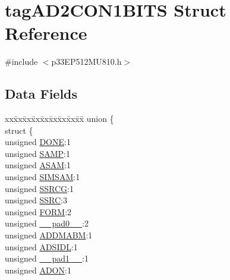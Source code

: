 \hypertarget{structtag_a_d2_c_o_n1_b_i_t_s}{}\section{tag\+A\+D2\+C\+O\+N1\+B\+I\+TS Struct Reference}
\label{structtag_a_d2_c_o_n1_b_i_t_s}


{\ttfamily \#include $<$p33\+E\+P512\+M\+U810.\+h$>$}

\subsection*{Data Fields}
\begin{DoxyCompactItemize}
\item 
\begin{tabbing}
xx\=xx\=xx\=xx\=xx\=xx\=xx\=xx\=xx\=\kill
union \{\\
\>struct \{\\
\>\>unsigned \hyperlink{structtag_a_d2_c_o_n1_b_i_t_s_a15532dd1cb7c63353dbcb36d3962baf1}{DONE}:1\\
\>\>unsigned \hyperlink{structtag_a_d2_c_o_n1_b_i_t_s_a2c46df2a264a12a002c863d23b94fc5b}{SAMP}:1\\
\>\>unsigned \hyperlink{structtag_a_d2_c_o_n1_b_i_t_s_a913e6cc3f1d245b0476d7c561769366d}{ASAM}:1\\
\>\>unsigned \hyperlink{structtag_a_d2_c_o_n1_b_i_t_s_aec58b2ae10279e5d3cc9eef4fbe7aeba}{SIMSAM}:1\\
\>\>unsigned \hyperlink{structtag_a_d2_c_o_n1_b_i_t_s_a70991a103c529d7b9b7fde74950ee286}{SSRCG}:1\\
\>\>unsigned \hyperlink{structtag_a_d2_c_o_n1_b_i_t_s_a9810ed3c5c2ba3614bb8e9bbd603a907}{SSRC}:3\\
\>\>unsigned \hyperlink{structtag_a_d2_c_o_n1_b_i_t_s_afbdaf5e6343bd8c6dd528acc7c621f0d}{FORM}:2\\
\>\>unsigned \hyperlink{structtag_a_d2_c_o_n1_b_i_t_s_adf71f3d8410c1f1dbbc96680a92c49af}{\_\_pad0\_\_}:2\\
\>\>unsigned \hyperlink{structtag_a_d2_c_o_n1_b_i_t_s_ae338b78f9690cf9d9987d26d98699dee}{ADDMABM}:1\\
\>\>unsigned \hyperlink{structtag_a_d2_c_o_n1_b_i_t_s_a59f01714def50ae128668a90c0d2d2bc}{ADSIDL}:1\\
\>\>unsigned \hyperlink{structtag_a_d2_c_o_n1_b_i_t_s_acaf2d0924a107ec6e8d2e31febaf66f9}{\_\_pad1\_\_}:1\\
\>\>unsigned \hyperlink{structtag_a_d2_c_o_n1_b_i_t_s_aa35d5855858b9350b403822a0ebe771f}{ADON}:1\\

\end{tabbing}
\end{DoxyCompactItemize}
